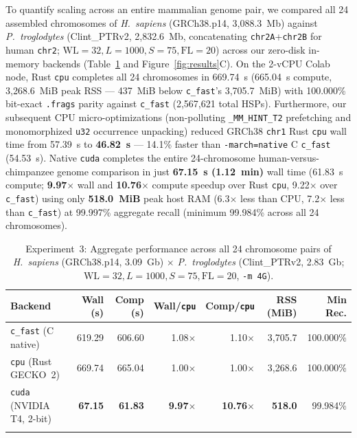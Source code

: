 \documentclass[pdflatex,sn-vancouver,Numbered]{sn-jnl}
\newcommand{\hlExactParityPct}{100.000\%}
\newcommand{\eThreeCfastWall}{619.29} \newcommand{\eThreeCfastComp}{606.60} \newcommand{\eThreeCfastRss}{3,705.7} \newcommand{\eThreeCfastRecall}{100.000\%}
\newcommand{\eThreeCpuWall}{669.74}   \newcommand{\eThreeCpuComp}{665.04}   \newcommand{\eThreeCpuRss}{3,268.6}   \newcommand{\eThreeCpuFrags}{2,567,621}
\newcommand{\eThreeCudaWall}{67.15}   \newcommand{\eThreeCudaComp}{61.83}   \newcommand{\eThreeCudaRss}{518.0}    \newcommand{\eThreeCudaRecall}{99.984\%}
\newcommand{\eThreeCudaSpWall}{9.97$\times$}
\newcommand{\eThreeCudaSpComp}{10.76$\times$}
\newcommand{\eThreeCfastSpWall}{1.08$\times$}
\begin{document}
To quantify scaling across an entire mammalian genome pair, we compared all 24 assembled chromosomes of \textit{H.~sapiens} (GRCh38.p14, 3,088.3~Mb) against \textit{P.~troglodytes} (Clint\_PTRv2, 2,832.6~Mb, concatenating \texttt{chr2A}+\texttt{chr2B} for human \texttt{chr2}; $\text{WL}=32, L=1000, S=75, \text{FL}=20$) across our zero-disk in-memory backends (Table~\ref{tab:exp3} and Figure~\ref{fig:results}C). On the 2-vCPU Colab node, Rust \texttt{cpu} completes all 24 chromosomes in \eThreeCpuWall{}~s (\eThreeCpuComp{}~s compute, \eThreeCpuRss{}~MiB peak RSS --- 437~MiB below \texttt{c\_fast}'s \eThreeCfastRss{}~MiB) with \hlExactParityPct{} bit-exact \texttt{.frags} parity against \texttt{c\_fast} (\eThreeCpuFrags{} total HSPs). Furthermore, our subsequent CPU micro-optimizations (non-polluting \texttt{\_MM\_HINT\_T2} prefetching and monomorphized \texttt{u32} occurrence unpacking) reduced GRCh38 \texttt{chr1} Rust \texttt{cpu} wall time from 57.39~s to \textbf{46.82~s} --- 14.1\% faster than \texttt{-march=native} C \texttt{c\_fast} (54.53~s). Native \texttt{cuda} completes the entire 24-chromosome human-versus-chimpanzee genome comparison in just \textbf{\eThreeCudaWall{}~s (1.12~min)} wall time (\eThreeCudaComp{}~s compute; \textbf{\eThreeCudaSpWall{}} wall and \textbf{\eThreeCudaSpComp{}} compute speedup over Rust \texttt{cpu}, 9.22$\times$ over \texttt{c\_fast}) using only \textbf{\eThreeCudaRss{}~MiB} peak host RAM (6.3$\times$ less than CPU, 7.2$\times$ less than \texttt{c\_fast}) at 99.997\% aggregate recall (minimum \eThreeCudaRecall{} across all 24 chromosomes).

\begin{table}[ht]
\centering
\scriptsize
\setlength{\tabcolsep}{2.5pt}
\caption{Experiment~3: Aggregate performance across all 24 chromosome pairs of \textit{H.~sapiens} (GRCh38.p14, 3.09~Gb) $\times$ \textit{P.~troglodytes} (Clint\_PTRv2, 2.83~Gb; $\text{WL}=32, L=1000, S=75, \text{FL}=20$, \texttt{-m 4G}).}\label{tab:exp3}
\begin{tabular*}{\textwidth}{@{\extracolsep\fill}lrrrrrr}
\toprule
Backend & Wall (s) & Comp (s) & Wall/\texttt{cpu} & Comp/\texttt{cpu} & RSS (MiB) & Min Rec. \\
\midrule
\texttt{c\_fast} (C native) & \eThreeCfastWall & \eThreeCfastComp & \eThreeCfastSpWall & 1.10$\times$ & \eThreeCfastRss & \eThreeCfastRecall \\
\texttt{cpu} (Rust GECKO~2) & \eThreeCpuWall   & \eThreeCpuComp   & 1.00$\times$ & 1.00$\times$ & \eThreeCpuRss & 100.000\% \\
\texttt{cuda} (NVIDIA T4, 2-bit) & \textbf{\eThreeCudaWall} & \textbf{\eThreeCudaComp} & \textbf{\eThreeCudaSpWall} & \textbf{\eThreeCudaSpComp} & \textbf{\eThreeCudaRss} & \eThreeCudaRecall \\
\botrule
\end{tabular*}
\end{table}
\end{document}
